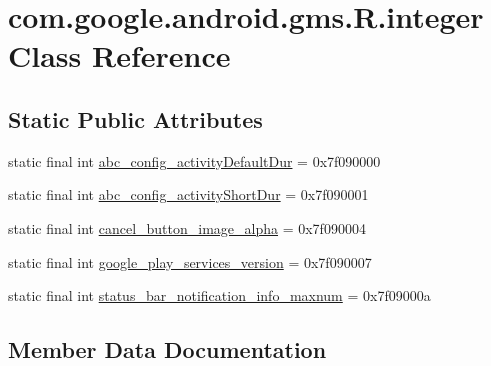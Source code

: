 \hypertarget{classcom_1_1google_1_1android_1_1gms_1_1R_1_1integer}{}\section{com.\+google.\+android.\+gms.\+R.\+integer Class Reference}
\label{classcom_1_1google_1_1android_1_1gms_1_1R_1_1integer}
\subsection*{Static Public Attributes}
\begin{DoxyCompactItemize}
\item 
static final int \mbox{\hyperlink{classcom_1_1google_1_1android_1_1gms_1_1R_1_1integer_a96c1fac66297c0f82b2b7e9d17d9677a}{abc\+\_\+config\+\_\+activity\+Default\+Dur}} = 0x7f090000
\item 
static final int \mbox{\hyperlink{classcom_1_1google_1_1android_1_1gms_1_1R_1_1integer_a6f17db400371cd27bcb20ef482ebb9af}{abc\+\_\+config\+\_\+activity\+Short\+Dur}} = 0x7f090001
\item 
static final int \mbox{\hyperlink{classcom_1_1google_1_1android_1_1gms_1_1R_1_1integer_aae3b84c8aaceb0788cbf2bcb1fe484c5}{cancel\+\_\+button\+\_\+image\+\_\+alpha}} = 0x7f090004
\item 
static final int \mbox{\hyperlink{classcom_1_1google_1_1android_1_1gms_1_1R_1_1integer_a528dd127909b77675e854a1ac35e2611}{google\+\_\+play\+\_\+services\+\_\+version}} = 0x7f090007
\item 
static final int \mbox{\hyperlink{classcom_1_1google_1_1android_1_1gms_1_1R_1_1integer_a0e28f3e70341c1ddfca5420702f888bc}{status\+\_\+bar\+\_\+notification\+\_\+info\+\_\+maxnum}} = 0x7f09000a
\end{DoxyCompactItemize}


\subsection{Member Data Documentation}
\mbox{\label{classcom_1_1google_1_1android_1_1gms_1_1R_1_1integer_a96c1fac66297c0f82b2b7e9d17d9677a}} 
